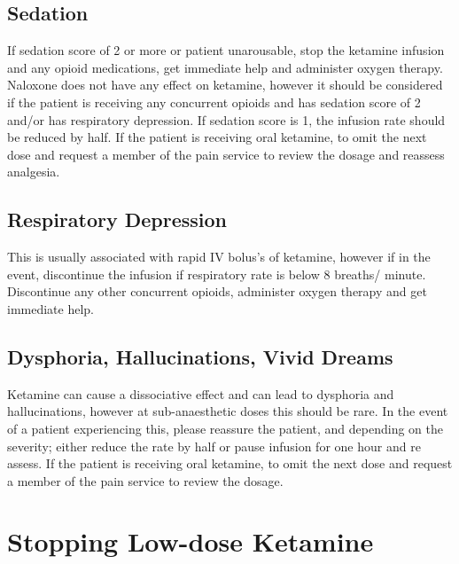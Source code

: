 \documentclass[
]{book}
\begin{document}
\hypertarget{sedation}{%
\section{Sedation}\label{sedation}}

If sedation score of 2 or more or patient unarousable, stop the ketamine infusion and any opioid medications, get immediate help and administer oxygen therapy. Naloxone does not have any effect on ketamine, however it should be considered if the patient is receiving any concurrent opioids and has sedation score of 2 and/or has respiratory depression. If sedation score is 1, the infusion rate should be reduced by half. If the patient is receiving oral ketamine, to omit the next dose and request a member of the pain service to review the dosage and reassess analgesia.

\hypertarget{respiratory-depression}{%
\section{Respiratory Depression}\label{respiratory-depression}}

This is usually associated with rapid IV bolus's of ketamine, however if in the event, discontinue the infusion if respiratory rate is below 8 breaths/ minute. Discontinue any other concurrent opioids, administer oxygen therapy and get immediate help.

\hypertarget{dysphoria-hallucinations-vivid-dreams}{%
\section{Dysphoria, Hallucinations, Vivid Dreams}\label{dysphoria-hallucinations-vivid-dreams}}

Ketamine can cause a dissociative effect and can lead to dysphoria and hallucinations, however at sub-anaesthetic doses this should be rare. In the event of a patient experiencing this, please reassure the patient, and depending on the severity; either reduce the rate by half or pause infusion for one hour and re assess. If the patient is receiving oral ketamine, to omit the next dose and request a member of the pain service to review the dosage.

\hypertarget{stopping-low-dose-ketamine}{%
\chapter{Stopping Low-dose Ketamine}\label{stopping-low-dose-ketamine}}
\end{document}
